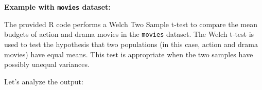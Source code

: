 \documentclass[
]{book}
\newenvironment{Shaded}{\begin{snugshade}}{\end{snugshade}}
\newcommand{\CommentTok}[1]{\textcolor[rgb]{0.56,0.35,0.01}{\textit{#1}}}
\newcommand{\FunctionTok}[1]{\textcolor[rgb]{0.13,0.29,0.53}{\textbf{#1}}}
\newcommand{\NormalTok}[1]{#1}
\newcommand{\OtherTok}[1]{\textcolor[rgb]{0.56,0.35,0.01}{#1}}
\newcommand{\SpecialCharTok}[1]{\textcolor[rgb]{0.81,0.36,0.00}{\textbf{#1}}}
\newcommand{\StringTok}[1]{\textcolor[rgb]{0.31,0.60,0.02}{#1}}
\begin{document}
\textbf{Example with \texttt{movies} dataset:}

The provided R code performs a Welch Two Sample t-test to compare the mean budgets of action and drama movies in the \texttt{movies} dataset. The Welch t-test is used to test the hypothesis that two populations (in this case, action and drama movies) have equal means. This test is appropriate when the two samples have possibly unequal variances.

\begin{Shaded}
\end{Shaded}

Let's analyze the output:
\end{document}
